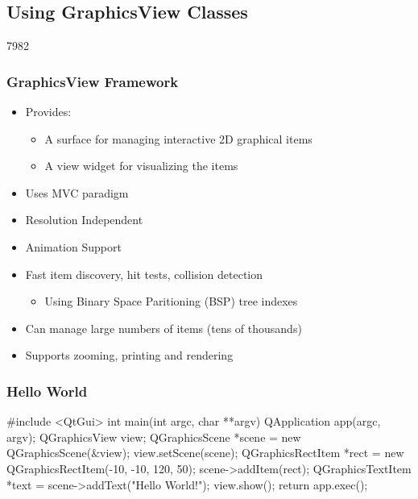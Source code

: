 %
%
%
%

\subsection{Using GraphicsView Classes}
\begin{slide}{7982}
\frametitle{GraphicsView Framework}
\begin{itemize}
\item Provides:
    \begin{itemize}
    \item A surface for managing interactive 2D graphical items
    \item A view widget for visualizing the items
    \end{itemize}
\item Uses MVC paradigm
\item Resolution Independent
\item Animation Support
\item Fast item discovery, hit tests, collision detection
    \begin{itemize}
    \item Using Binary Space Paritioning (BSP) tree indexes
    \end{itemize}
\item Can manage large numbers of items (tens of thousands)
\item Supports zooming, printing and rendering

\end{itemize}
\end{slide}


\begin{slide}[fragile]
\frametitle{Hello World}

\begin{cpp}
#include <QtGui>
int main(int argc, char **argv) {
  QApplication app(argc, argv);
  QGraphicsView view;
  QGraphicsScene *scene = new QGraphicsScene(&view);
  view.setScene(scene);
  QGraphicsRectItem *rect = 
      new QGraphicsRectItem(-10, -10, 120, 50);
  scene->addItem(rect);
  QGraphicsTextItem *text = scene->addText("Hello World!");
  view.show();
  return app.exec();
}
\end{cpp}
 \\

\end{slide}

